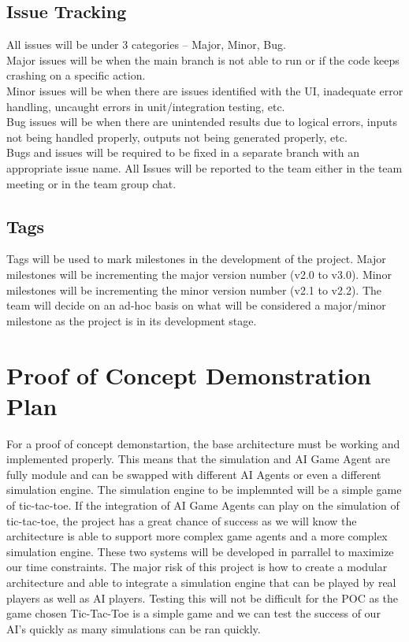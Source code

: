 \documentclass{article}
\begin{document}
\subsection{Issue Tracking}
All issues will be under 3 categories – Major, Minor, Bug. 
\\Major issues will be when the main branch is not able to run or if the code keeps crashing on a specific action.
\\Minor issues will be when there are issues identified with the UI, inadequate error handling, uncaught errors in unit/integration testing, etc.
\\Bug issues will be when there are unintended results due to logical errors, inputs not being handled properly, outputs not being generated properly, etc.
\\Bugs and issues will be required to be fixed in a separate branch with an appropriate issue name. All Issues will be reported to the team either in the team meeting or in the team group chat. 

\subsection{Tags}
Tags will be used to mark milestones in the development of the project. Major milestones will be incrementing the major version number (v2.0 to v3.0). Minor milestones will be incrementing the minor version number (v2.1 to v2.2). The team will decide on an ad-hoc basis on what will be considered a major/minor milestone as the project is in its development stage.

\section{Proof of Concept Demonstration Plan}

For a proof of concept demonstartion, the base architecture must be working and implemented properly. This means that the simulation and AI Game Agent are fully
module and can be swapped with different AI Agents or even a different simulation engine. The simulation engine to be implemnted will be a simple game of tic-tac-toe.
If the integration of AI Game Agents can play on the simulation of tic-tac-toe, the project has a great chance of success as we will know the architecture is able to support
more complex game agents and a more complex simulation engine. These two systems will be developed in parrallel to maximize our time constraints.
The major risk of this project is how to create a modular architecture and able to integrate a simulation engine that can be played by real players as well as AI players. Testing this will not be difficult for the POC as the game chosen Tic-Tac-Toe is a simple game and we can test the success of our AI's quickly as many simulations can be ran quickly.
\end{document}
